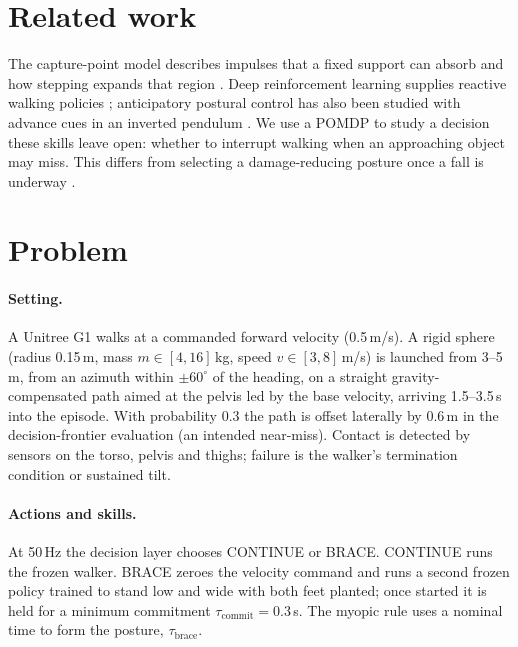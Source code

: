 \documentclass[10pt,twocolumn]{article}
\begin{document}
\section{Related work}
The capture-point model describes impulses that a fixed support can absorb and how stepping expands that region \citep{pratt2006capture,koolen2012capturability}. Deep reinforcement learning supplies reactive walking policies \citep{zakka2025playground}; anticipatory postural control has also been studied with advance cues in an inverted pendulum \citep{maffei2017anticipatory}. We use a POMDP \citep{kaelbling1998pomdp,kochenderfer2022algorithms} to study a decision these skills leave open: whether to interrupt walking when an approaching object may miss. This differs from selecting a damage-reducing posture once a fall is underway \citep{fujiwara2002ukemi}.

\section{Problem}
\paragraph{Setting.} A Unitree G1 walks at a commanded forward velocity (0.5\,m/s). A rigid sphere (radius 0.15\,m, mass $m\in[4,16]$\,kg, speed $v\in[3,8]$\,m/s) is launched from 3--5\,m, from an azimuth within $\pm60^\circ$ of the heading, on a straight gravity-compensated path aimed at the pelvis led by the base velocity, arriving 1.5--3.5\,s into the episode. With probability 0.3 the path is offset laterally by 0.6\,m in the decision-frontier evaluation (an intended near-miss). Contact is detected by sensors on the torso, pelvis and thighs; failure is the walker's termination condition or sustained tilt.

\paragraph{Actions and skills.} At 50\,Hz the decision layer chooses CONTINUE or BRACE. CONTINUE runs the frozen walker. BRACE zeroes the velocity command and runs a second frozen policy trained to stand low and wide with both feet planted; once started it is held for a minimum commitment $\tau_{\text{commit}}=0.3$\,s. The myopic rule uses a nominal time to form the posture, $\tau_{\text{brace}}$.
\end{document}
